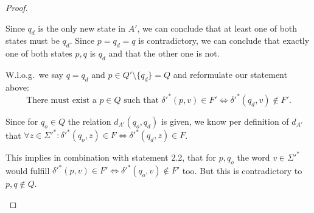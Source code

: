 \begin{proof}
\begin{description}
		Since $q_d$ is the only new state in $A'$, we can conclude that at least one of both states must be $q_d$. Since $p = q_d = q$ is contradictory, we can conclude that exactly one of both states $p, q$ is $q_d$ and that the other one is not.
		
		W.l.o.g.\ we say $q = q_d$ and $p \in Q' \setminus \{q_d\} = Q$ and reformulate our statement above:
		\begin{equation}
		\text{There must exist a }p \in Q\text{ such that }\delta'^*(p,v) \in F' \Leftrightarrow \delta'^*(q_d,v) \notin F'.
		\end{equation}
		
		
		Since for $q_o \in Q$ the relation $d_{A'}(q_o, q_d)$ is given, we know per definition of $d_{A'}$ that $\forall z\in\Sigma'^*\colon \delta'^*(q_o,z) \in F \Leftrightarrow \delta'^*(q_d,z) \in F$.
		
		This implies in combination with statement 2.2, that for $p,q_o$ the word $v\in\Sigma'^*$ would fulfill $\delta'^*(p,v) \in F' \Leftrightarrow \delta'^*(q_o,v) \notin F'$ too. But this is contradictory to $p,q \notin Q$.
		
	\end{description}
\end{proof}


